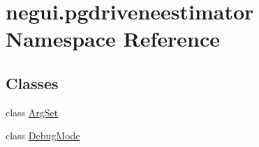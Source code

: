 \hypertarget{namespacenegui_1_1pgdriveneestimator}{}\section{negui.\+pgdriveneestimator Namespace Reference}
\label{namespacenegui_1_1pgdriveneestimator}
\subsection*{Classes}
\begin{DoxyCompactItemize}
\item 
class \hyperlink{classnegui_1_1pgdriveneestimator_1_1ArgSet}{Arg\+Set}
\item 
class \hyperlink{classnegui_1_1pgdriveneestimator_1_1DebugMode}{Debug\+Mode}
\end{DoxyCompactItemize}
